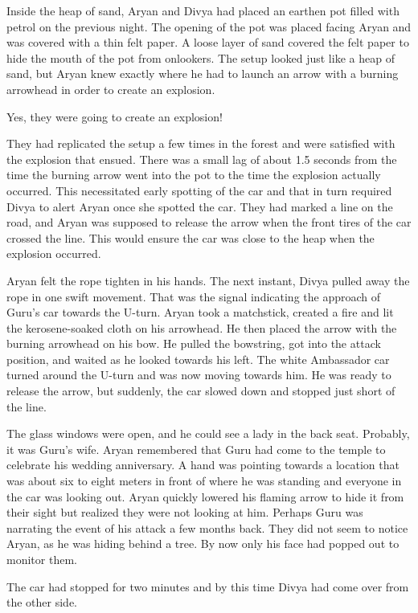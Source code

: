 Inside the heap of sand, Aryan and Divya had placed an earthen pot filled with
petrol on the previous night. The opening of the pot was placed facing Aryan and
was covered with a thin felt paper. A loose layer of sand covered the felt paper
to hide the mouth of the pot from onlookers. The setup looked just like a heap
of sand, but Aryan knew exactly where he had to launch an arrow with a burning
arrowhead in order to create an explosion.

Yes, they were going to create an explosion!

They had replicated the setup a few times in the forest and were satisfied with
the explosion that ensued. There was a small lag of about 1.5 seconds from the
time the burning arrow went into the pot to the time the explosion actually
occurred. This necessitated early spotting of the car and that in turn required
Divya to alert Aryan once she spotted the car. They had marked a line on the
road, and Aryan was supposed to release the arrow when the front tires of the
car crossed the line. This would ensure the car was close to the heap when the
explosion occurred.

Aryan felt the rope tighten in his hands. The next instant, Divya pulled away
the rope in one swift movement. That was the signal indicating the approach of
Guru's car towards the U-turn. Aryan took a matchstick, created a fire and
lit the kerosene-soaked cloth on his arrowhead. He then placed the arrow
with the burning arrowhead on his bow. He pulled the bowstring, got into
the attack position, and waited as he looked towards his left. The white
Ambassador car turned around the U-turn and was now moving towards him. He was
ready to release the arrow, but suddenly, the car slowed down and stopped just
short of the line.

The glass windows were open, and he could see a lady in the back seat. Probably,
it was Guru's wife. Aryan remembered that Guru had come to the temple to
celebrate his wedding anniversary. A hand was pointing towards a location that
was about six to eight meters in front of where he was standing and everyone in
the car was looking out. Aryan quickly lowered his flaming arrow to hide it
from their sight but realized they were not looking at him. Perhaps Guru was
narrating the event of his attack a few months back. They did not seem to notice
Aryan, as he was hiding behind a tree. By now only his face had popped out to monitor
them.

The car had stopped for two minutes and by this time Divya had come over from the
other side.

